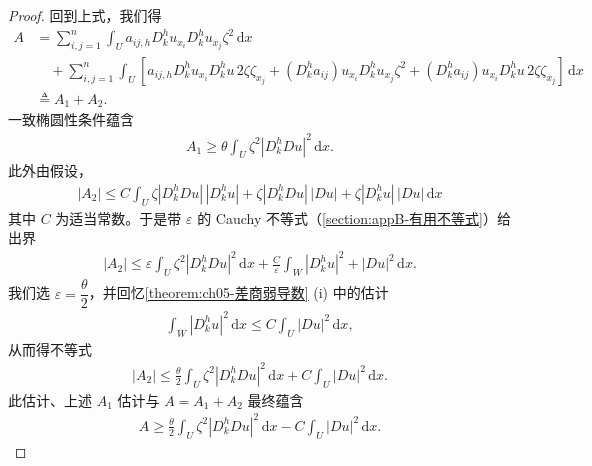\documentclass[../../main.tex]{subfiles}
\begin{document}
\begin{proof}
回到上式，我们得
\begin{align}
A&=\sum_{i,j=1}^{n}\int_{U}a_{ij,h}D_{k}^{h}u_{x_{i}}D_{k}^{h}u_{x_{j}}\zeta^{2}\,\mathrm{d}x\\
&\quad+\sum_{i,j=1}^{n}\int_{U}\left[a_{ij,h}D_{k}^{h}u_{x_{i}}D_{k}^{h}u\,2\zeta\zeta_{x_{j}}+(D_{k}^{h}a_{ij})u_{x_{i}}D_{k}^{h}u_{x_{j}}\zeta^{2}+(D_{k}^{h}a_{ij})u_{x_{i}}D_{k}^{h}u\,2\zeta\zeta_{x_{j}}\right]\,\mathrm{d}x\\
&\triangleq A_{1}+A_{2}.
\end{align}
一致椭圆性条件蕴含
\begin{align}
A_{1}\geqslant\theta\int_{U}\zeta^{2}|D_{k}^{h}Du|^{2}\,\mathrm{d}x.
\end{align}
此外由假设，
\begin{align*}
|A_{2}|\leqslant C\int_{U}\zeta|D_{k}^{h}Du|\,|D_{k}^{h}u|+\zeta|D_{k}^{h}Du|\,|Du|+\zeta|D_{k}^{h}u|\,|Du|\,\mathrm{d}x
\end{align*}
其中 $C$ 为适当常数。于是带 $\varepsilon$ 的 Cauchy 不等式（\cref{section:appB-有用不等式}）给出界
\begin{align*}
|A_{2}|\leqslant\varepsilon\int_{U}\zeta^{2}|D_{k}^{h}Du|^{2}\,\mathrm{d}x+\frac{C}{\varepsilon}\int_{W}|D_{k}^{h}u|^{2}+|Du|^{2}\,\mathrm{d}x.
\end{align*}
我们选 $\varepsilon=\dfrac{\theta}{2}$，并回忆\cref{theorem:ch05-差商弱导数} (i) 中的估计
\begin{align*}
\int_{W}|D_{k}^{h}u|^{2}\,\mathrm{d}x\leqslant C\int_{U}|Du|^{2}\,\mathrm{d}x,
\end{align*}
从而得不等式
\begin{align*}
|A_{2}|\leqslant\frac{\theta}{2}\int_{U}\zeta^{2}|D_{k}^{h}Du|^{2}\,\mathrm{d}x+C\int_{U}|Du|^{2}\,\mathrm{d}x.
\end{align*}
此估计、上述 $A_{1}$ 估计与 $A=A_{1}+A_{2}$ 最终蕴含
\begin{align}
A\geqslant\frac{\theta}{2}\int_{U}\zeta^{2}|D_{k}^{h}Du|^{2}\,\mathrm{d}x-C\int_{U}|Du|^{2}\,\mathrm{d}x.
\end{align}


\end{proof}
\end{document}
